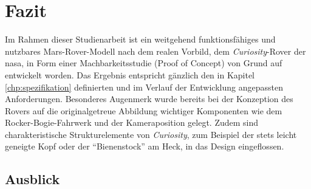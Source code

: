 \chapter{Fazit}
\label{chp:fazit}

Im Rahmen dieser Studienarbeit ist ein weitgehend funktionsfähiges und nutzbares Mars-Rover-Modell nach dem realen Vorbild, dem \textit{Curiosity}-Rover der \acs{nasa}, in Form einer Machbarkeitsstudie (Proof of Concept) von Grund auf entwickelt worden.
Das Ergebnis entspricht gänzlich den in Kapitel \ref{chp:spezifikation} definierten und im Verlauf der Entwicklung angepassten Anforderungen.
Besonderes Augenmerk wurde bereits bei der Konzeption des Rovers auf die originalgetreue Abbildung wichtiger Komponenten wie dem Rocker-Bogie-Fahrwerk und der Kameraposition gelegt.
Zudem sind charakteristische Strukturelemente von \textit{Curiosity}, zum Beispiel der stets leicht geneigte Kopf oder der \enquote{Bienenstock} am Heck, in das Design eingeflossen.


\section{Ausblick}
\label{sec:ausblick}


